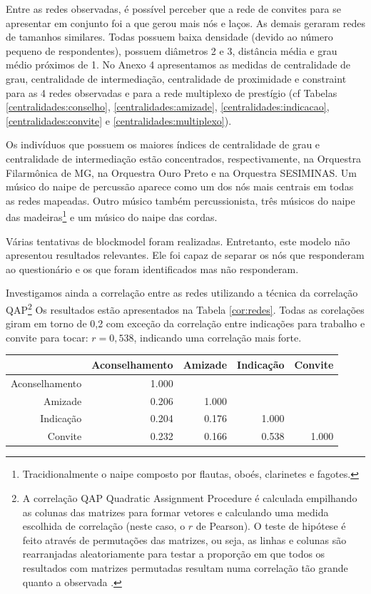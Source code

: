 \documentclass[a4paper, 12pt, openright, oneside, german, french, english, brazil]{abntex2}
\begin{document}
	Entre as redes observadas, é possível perceber que a rede de convites para se apresentar em conjunto foi a que gerou mais nós e laços. As demais geraram redes de tamanhos similares. Todas possuem baixa densidade (devido ao número pequeno de respondentes), possuem diâmetros 2 e 3, distância média e grau médio próximos de 1. No Anexo 4 apresentamos as medidas de centralidade de grau, centralidade de intermediação, centralidade de proximidade e constraint para as 4 redes observadas e para a rede multiplexo de prestígio (cf Tabelas \ref{centralidades:conselho}, \ref{centralidades:amizade}, \ref{centralidades:indicacao}, \ref{centralidades:convite} e \ref{centralidades:multiplexo}).
	
	Os indivíduos que possuem os maiores índices de centralidade de grau e centralidade de intermediação estão concentrados, respectivamente, na Orquestra Filarmônica de MG, na Orquestra Ouro Preto e na Orquestra SESIMINAS. Um músico do naipe de percussão aparece como um dos nós mais centrais em todas as redes mapeadas. Outro músico também percussionista, três músicos do naipe das madeiras\footnote{Tracidionalmente o naipe composto por flautas, oboés, clarinetes e fagotes.} e um músico do naipe das cordas.
	
	Várias tentativas de blockmodel foram realizadas. Entretanto, este modelo não apresentou resultados relevantes. Ele foi capaz de separar os nós que responderam ao questionário e os que foram identificados mas não responderam.

	
	Investigamos ainda a correlação entre as redes utilizando a técnica da correlação QAP\footnote{A correlação QAP {Quadratic Assignment Procedure} é calculada empilhando as colunas das matrizes para formar vetores e calculando uma medida escolhida de correlação (neste caso, o $r$ de Pearson). O teste de hipótese é feito através de permutações das matrizes, ou seja, as linhas e colunas são rearranjadas aleatoriamente para testar a proporção em que todos os resultados com matrizes permutadas resultam numa correlação tão grande quanto a observada \cite{borgatti2018analyzing}.} Os resultados estão apresentados na Tabela \ref{cor:redes}. Todas as corelações giram em torno de 0,2 com exceção da correlação entre indicações para trabalho e convite para tocar: $r = 0,538$, indicando uma correlação mais forte.
	
	\begin{table}[ht]
		{\begin{tabular}{rrrrr}
			\hline
			& Aconselhamento & Amizade & Indicação & Convite \\ 
			\hline
			Aconselhamento & 1.000 &  &  &  \\ 
			Amizade & 0.206 & 1.000 &  &  \\ 
			Indicação & 0.204 & 0.176 & 1.000 &  \\ 
			Convite & 0.232 & 0.166 & 0.538 & 1.000 \\ 
			\hline
		\end{tabular}
	}
		{}
	\end{table}
	
\end{document}
